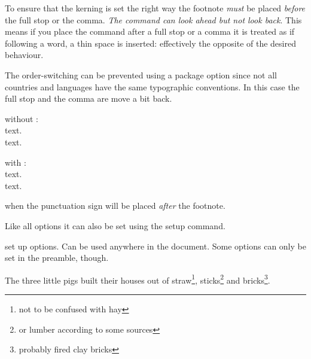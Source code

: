 \documentclass[toc=index,toc=bib]{cnpkgdoc}
\begin{document}
To ensure that the kerning is set the right way the footnote \emph{must} be placed
\emph{before} the full stop or the comma. \emph{The command can look ahead but not look back}.
This means if you place the  command after a full stop or a comma it is
treated as if following a word, \ie a thin space is inserted: effectively the opposite 
of the desired behaviour.

The order-switching can be prevented using a package option since not all countries
and languages have the same typographic conventions. In this case the full stop
and the comma are move a bit back.

\bigskip\hfil
\begin{minipage}{.25\linewidth}
\setlength\parindent{0pt}%
without \fnpct:\\
{%
\null\quad text.\footnotemark[1]\\
\null\quad text\footnotemark[1]}.

with \fnpct:\\
\null\quad text\footnotemark[1].\\
%
\null\quad text\footnotemark[1].
\end{minipage}\hfil

\begin{beschreibung}
  when  the punctuation sign
 will be placed \emph{after} the footnote.
\end{beschreibung}
Like all options it can also be set using the setup command.
\begin{beschreibung}
  set up options. Can be used anywhere in the document.
 Some options can only be set in the preamble, though.
\end{beschreibung}
\begin{beispiel}
 \begin{minipage}{.4\linewidth}
  \noindent The three little pigs built their houses
  out of straw\footnote{not to be confused with hay},
  sticks\footnote{or lumber according to some sources}
  and bricks\footnote{probably fired clay bricks}.
 \end{minipage}
\end{beispiel}
\end{document}
